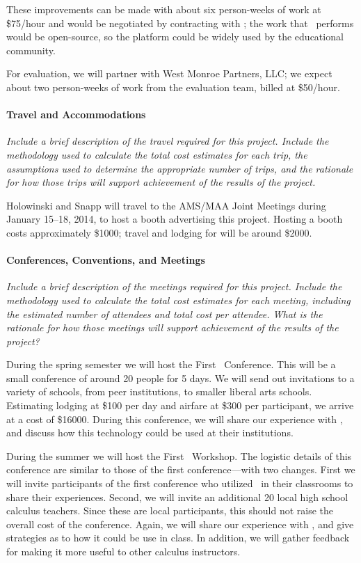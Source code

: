 These improvements can be made with about six person-weeks of work at
\$75/hour and would be negotiated by contracting with \gratisu; the
work that \gratisu\ performs would be open-source, so the platform
could be widely used by the educational community.

For evaluation, we will partner with West Monroe Partners, LLC; we
expect about two person-weeks of work from the evaluation team, billed
at \$50/hour.

\paragraph{Travel and Accommodations}
\textsl{Include a brief description of the travel required for this
  project.  Include the methodology used to calculate the total cost
  estimates for each trip, the assumptions used to determine the
  appropriate number of trips, and the rationale for how those trips
  will support achievement of the results of the project.}

\vspace{\topsep}

Holowinski and Snapp will travel to the AMS/MAA Joint Meetings during
January 15--18, 2014, to host a booth advertising this project.
Hosting a booth costs approximately \$1000; travel and lodging for
will be around \$2000.


\paragraph{Conferences, Conventions, and Meetings}
\textsl{Include a brief description of the meetings required for this
  project. Include the methodology used to calculate the total cost
  estimates for each meeting, including the estimated number of
  attendees and total cost per attendee. What is the rationale for how
  those meetings will support achievement of the results of the
  project?}

\vspace{\topsep}

During the spring semester we will host the First
\mooculus\ Conference. This will be a small conference of around 20
people for 5 days. We will send out invitations to a variety of
schools, from peer institutions, to smaller liberal arts
schools. Estimating lodging at \$100 per day and airfare at \$300 per
participant, we arrive at a cost of \$16000. During this conference,
we will share our experience with \mooculus, and discuss how this
technology could be used at their institutions.

During the summer we will host the First \mooculus\ Workshop. The
logistic details of this conference are similar to those of the first
conference---with two changes. First we will invite participants of
the first conference who utilized \mooculus\ in their classrooms to
share their experiences. Second, we will invite an additional 20 local
high school calculus teachers. Since these are local participants,
this should not raise the overall cost of the conference. Again, we
will share our experience with \mooculus, and give strategies as to
how it could be use in class. In addition, we will gather feedback for
making it more useful to other calculus instructors.
